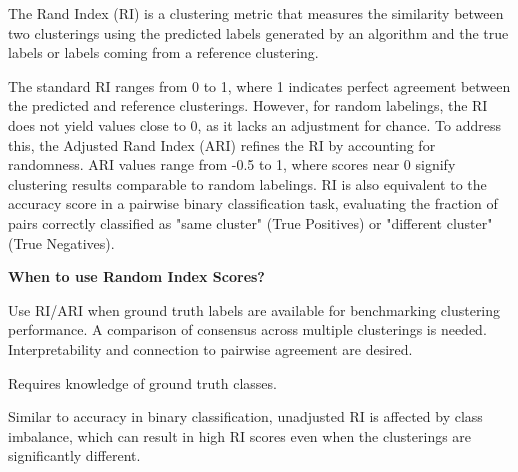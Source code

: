 The Rand Index (RI) is a clustering metric that measures the similarity between two clusterings using the predicted labels generated by an algorithm
and the true labels or labels coming from a reference clustering.

\begin{center}
\end{center}

The standard RI ranges from 0 to 1, where 1 indicates perfect agreement between the predicted and reference clusterings.
However, for random labelings, the RI does not yield values close to 0, as it lacks an adjustment for chance. To address this,
the Adjusted Rand Index (ARI) refines the RI by accounting for randomness. ARI values range from -0.5 to 1, where scores near 0
signify clustering results comparable to random labelings. RI is also equivalent to the accuracy score in a pairwise binary
classification task, evaluating the fraction of pairs correctly classified as "same cluster" (True Positives) or
"different cluster" (True Negatives).


\textbf{When to use Random Index Scores?}

Use RI/ARI when ground truth labels are available for benchmarking clustering performance. A comparison of consensus across
multiple clusterings is needed. Interpretability and connection to pairwise agreement are desired.

{
    \item Requires knowledge of ground truth classes.
    \item Similar to accuracy in binary classification, unadjusted RI is affected by class imbalance, which can result in high 
    RI scores even when the clusterings are significantly different.
}

